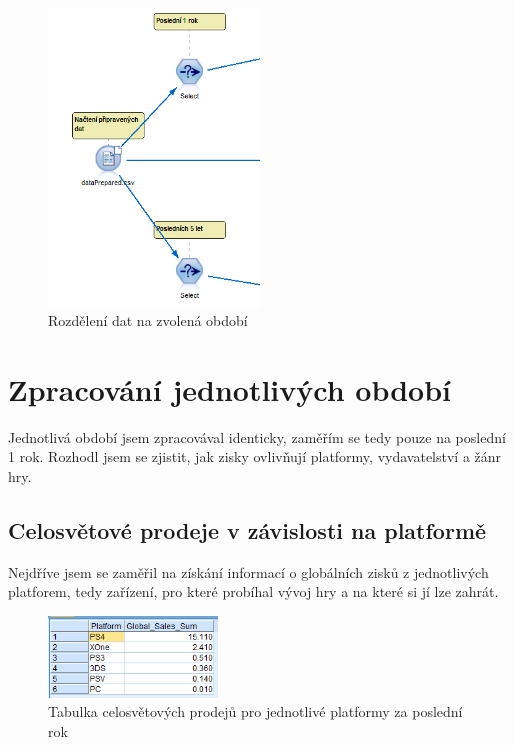 \documentclass[FM,ZP]{tulthesis}
\begin{document}
\begin{figure}[H]
\begin{center}
\includegraphics[width=0.5\textwidth]{images/separation.png}
\caption{Rozdělení dat na zvolená období}
\label{image}
\end{center}
\end{figure}
	
\section{Zpracování jednotlivých období}
Jednotlivá období jsem zpracovával identicky, zaměřím se tedy pouze na poslední 1 rok. Rozhodl jsem se zjistit, jak zisky ovlivňují platformy, vydavatelství a žánr hry.

\subsection{Celosvětové prodeje v závislosti na platformě}
Nejdříve jsem se zaměřil na získání informací o globálních zisků z jednotlivých platforem, tedy zařízení, pro které probíhal vývoj hry a na které si jí lze zahrát.

\begin{figure}[H]
\begin{center}
\includegraphics[width=0.4\textwidth]{images/platformSales.png}
\caption{Tabulka celosvětových prodejů pro jednotlivé platformy za poslední rok}
\label{image}
\end{center}
\end{figure}
\end{document}
